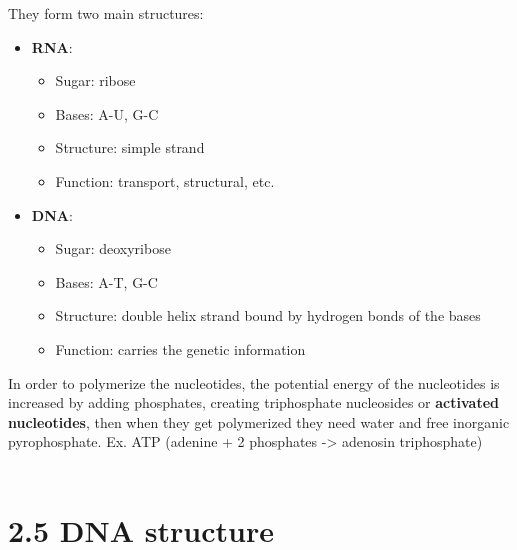 \documentclass[a4paper,landscape,10pt]{cheatsheet}
\begin{document}
They form two main structures:
\begin{itemize}
  \item \textbf{RNA}:
        \begin{itemize}
          \item Sugar: ribose
          \item Bases: A-U, G-C
          \item Structure: simple strand
          \item Function: transport, structural, etc.
        \end{itemize}
  \item \textbf{DNA}:
        \begin{itemize}
          \item Sugar: deoxyribose
          \item Bases: A-T, G-C
          \item Structure: double helix strand bound by hydrogen bonds of the bases
          \item Function: carries the genetic information
        \end{itemize}
\end{itemize}

In order to polymerize the nucleotides, the potential energy of the nucleotides is increased by adding phosphates,
creating triphosphate nucleosides or \textbf{activated nucleotides}, then when they get polymerized they need water and
free inorganic pyrophosphate. Ex. ATP (adenine + 2 phosphates -> adenosin triphosphate) \\

\hfil\\
\section*{2.5 DNA structure}
\end{document}
